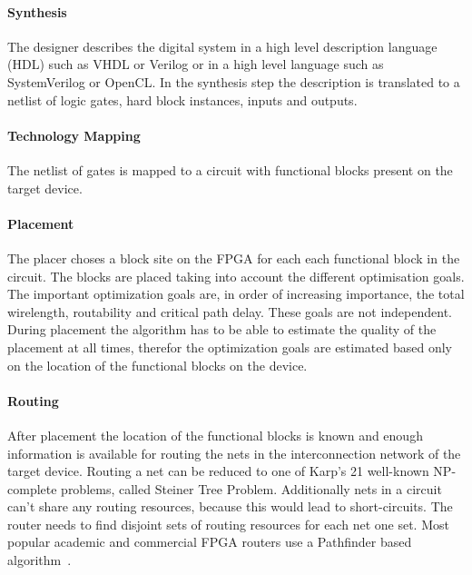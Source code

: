 \documentclass[a4paper,oneside,12pt]{article}
\begin{document}
\paragraph{Synthesis}
The designer describes the digital system in a high level description language (HDL) such as VHDL or Verilog or in a high level language such as SystemVerilog or OpenCL. In the synthesis step the description is translated to a netlist of logic gates, hard block instances, inputs and outputs.

\paragraph{Technology Mapping} 
The netlist of gates is mapped to a circuit with functional blocks present on the target device.

\paragraph{Placement}
The placer choses a block site on the FPGA for each each functional block in the circuit. The blocks are placed taking into account the different optimisation goals. The important optimization goals are, in order of increasing importance, the total wirelength, routability and critical path delay. These goals are not independent. During placement the algorithm has to be able to estimate the quality of the placement at all times, therefor the optimization goals are estimated based only on the location of the functional blocks on the device. 

\paragraph{Routing} After placement the location of the functional blocks is known and enough information is available for routing the nets in the interconnection network of the target device. Routing a net can be reduced to  one of Karp's 21 well-known NP-complete problems, called Steiner Tree Problem. Additionally nets in a circuit can't share any routing resources, because this would lead to short-circuits. The router needs to find disjoint sets of routing resources for each net one set. Most popular academic and commercial FPGA routers use a Pathfinder based algorithm~\cite{pathfinder, vprBVRJ, vprboek}.
\end{document}
